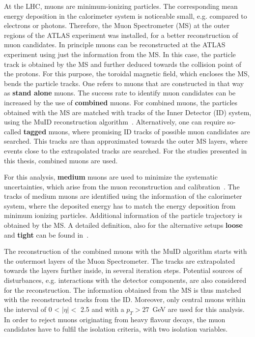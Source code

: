At the LHC, muons are minimum-ionizing particles. The corresponding mean energy deposition in the calorimeter system is noticeable small, e.g. compared to electrons or photons. Therefore, the Muon Spectrometer (MS) at the outer regions of the ATLAS experiment was installed, for a better reconstruction of muon candidates.  In principle muons can be reconstructed at the ATLAS experiment using just the information from the MS. In this case, the particle track is obtained by the MS and further deduced towards the collision point of the protons. For this purpose, the toroidal magnetic field, which encloses the MS, bends the particle tracks.  One refers to muons that are constructed in that way as \textbf{stand alone} muons. 
The success rate to identify muon candidates can be increased by the use of \textbf{combined} muons. For combined muons, the particles obtained with the MS are matched with tracks of the Inner Detector (ID) system, using the MuID reconstruction algorithm~\cite{Aad:2014rra}. Alternatively, one can require so-called \textbf{tagged} muons, where  promising ID tracks of possible muon candidates are searched. This tracks are than approximated towards the outer MS layers, where events  close to the extrapolated tracks  are searched. For the studies presented in this thesis, combined muons are used.


 
 
For this analysis, \textbf{medium} muons are used to minimize the systematic uncertainties, which arise from the muon reconstruction and calibration~\cite{Aad:2016jkr}. The tracks of medium muons are identified using the information of the calorimeter system, where the  deposited energy has to match the energy deposition from  minimum ionizing particles. Additional information of the particle trajectory is obtained by the MS. A detailed definition, also for the alternative setups \textbf{loose}  and \textbf{tight} can be found in~\cite{Aad:2016jkr}.
 

  
 The reconstruction of the combined muons with the MuID algorithm starts with the outermost layers of the Muon Spectrometer. The tracks are extrapolated towards the layers further inside, in several iteration steps. Potential sources of disturbances, e.g. interactions with the detector components, are also considered for the reconstruction. The information obtained from the MS is thus matched with the reconstructed tracks from the ID. Moreover, only central muons  within the interval of 0 < $\mid\eta\mid < $ 2.5 and with a $p_T>27$~GeV  are used for this analysis. In order to reject muons originating from heavy flavour decays, the muon candidates have to fulfil the isolation criteria, with two isolation variables.

